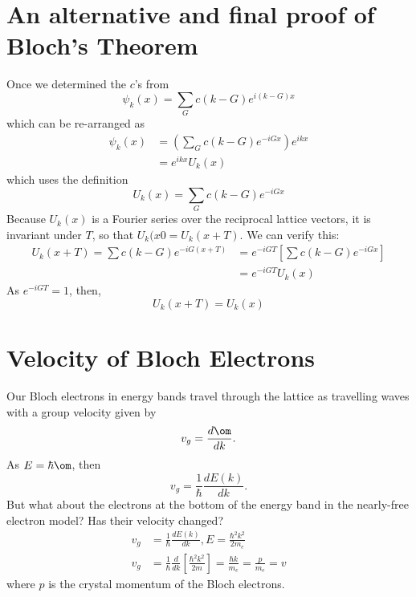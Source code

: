 \documentclass[a4paper, 11pt, normalem]{report}
\begin{document}
\section{An alternative and final proof of Bloch's Theorem}
Once we determined the $c$'s from 
\begin{equation}
    \psi_k(x) = \sum_G c(k-G)e^{i(k-G)x}
\end{equation}
which can be re-arranged as 
\begin{align}
    \psi_k(x) &= \left(\sum_G c(k-G)e^{-iGx}\right)e^{ikx} \\
              &= e^{ikx}U_k(x)
\end{align}
which uses the definition
\begin{equation}
    U_k(x) = \sum_G c(k-G)e^{-iGx}
\end{equation}
Because $U_k(x)$ is a Fourier series over the reciprocal lattice vectors, it is invariant under $T$, so that $U_k(x0 = U_k(x+T)$. 
We can verify this:
\begin{align}
    U_k(x+T) = \sum c(k-G)e^{-iG(x+T)} &= e^{-iGT}\left[\sum c(k-G)e^{-iGx}\right] \\
                                       &= e^{-iGT}U_k(x)
\end{align}
As $e^{-iGT} = 1$, then,
\begin{equation}
    U_k(x+T) = U_k(x)
\end{equation}

\section{Velocity of Bloch Electrons}
Our Bloch electrons in energy bands travel through the lattice as travelling waves with a group velocity given by
\begin{equation}
    v_g = \frac{d\om}{dk}.
\end{equation}
As $E = \hbar\om$, then
\begin{equation}
    v_g = \frac{1}{\hbar}\frac{dE(k)}{dk}.
\end{equation}
But what about the electrons at the bottom of the energy band in the nearly-free electron model? 
Has their velocity changed?
\begin{align}
    v_g &= \frac{1}{\hbar}\frac{dE(k)}{dk}, E = \frac{\hbar^2k^2}{2m_e} \\
    v_g &= \frac{1}{\hbar}\frac{d}{dk}\left[\frac{\hbar^2k^2}{2m}\right] = \frac{\hbar k}{m_e} = \frac{p}{m_e} = v
\end{align}
where $p$ is the crystal momentum of the Bloch electrons.
\end{document}
